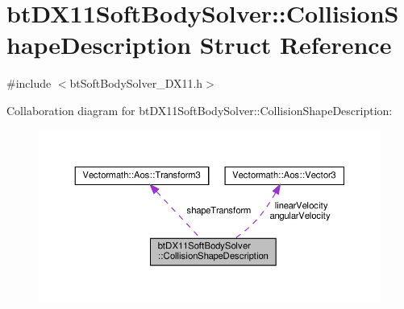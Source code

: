 \hypertarget{structbtDX11SoftBodySolver_1_1CollisionShapeDescription}{}\section{bt\+D\+X11\+Soft\+Body\+Solver\+:\+:Collision\+Shape\+Description Struct Reference}
\label{structbtDX11SoftBodySolver_1_1CollisionShapeDescription}


{\ttfamily \#include $<$bt\+Soft\+Body\+Solver\+\_\+\+D\+X11.\+h$>$}



Collaboration diagram for bt\+D\+X11\+Soft\+Body\+Solver\+:\+:Collision\+Shape\+Description\+:
\nopagebreak
\begin{figure}[H]
\begin{center}
\leavevmode
\includegraphics[width=350pt]{structbtDX11SoftBodySolver_1_1CollisionShapeDescription__coll__graph}
\end{center}
\end{figure}

